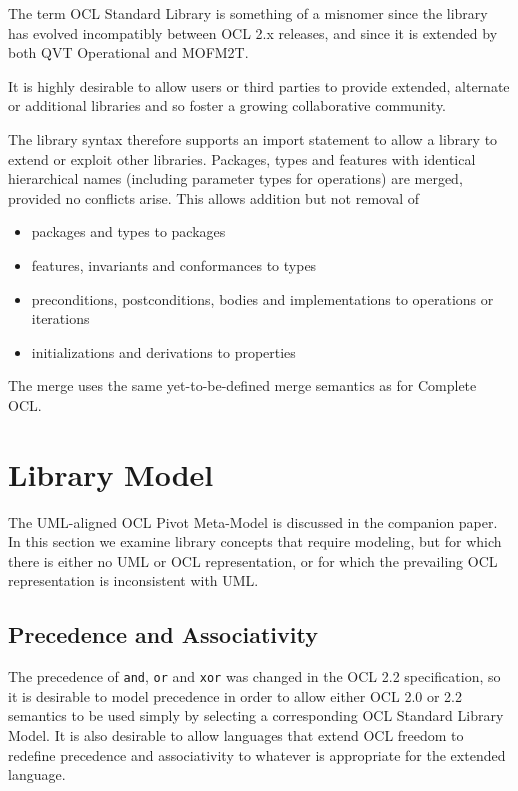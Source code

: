 \documentclass{eceasst}
\begin{document}
The term OCL Standard Library is something of a misnomer since the library has evolved incompatibly between OCL 2.x releases, and since it is extended by both QVT Operational and MOFM2T.

It is highly desirable to allow users or third parties to provide extended, alternate or additional libraries and so foster a growing collaborative community.

The library syntax therefore supports an import statement to allow a library to extend or exploit other libraries. Packages, types and features with identical hierarchical names (including parameter types for operations) are merged, provided no conflicts arise. This allows addition but not removal of

\begin{itemize}
\item packages and types to packages
\item features, invariants and conformances to types
\item preconditions, postconditions, bodies and implementations to operations or iterations
\item initializations and derivations to properties
\end{itemize}

The merge uses the same yet-to-be-defined merge semantics as for Complete OCL.

\section{Library Model}\label{LibraryModel}

The UML-aligned OCL Pivot Meta-Model is discussed in the companion paper\cite{OCL-UML}. In this section we examine library concepts that require modeling, but for which there is either no UML or OCL representation, or for which the prevailing OCL representation is inconsistent with UML.

\subsection{Precedence and Associativity}\label{Precedence}

The precedence of \verb|and|, \verb|or| and \verb|xor| was changed in the OCL 2.2 specification, so it is desirable to model precedence in order to allow either OCL 2.0 or 2.2 semantics to be used simply by selecting a corresponding OCL Standard Library Model. It is also desirable to allow languages that extend OCL freedom to redefine precedence and associativity to whatever is appropriate for the extended language.
\end{document}
